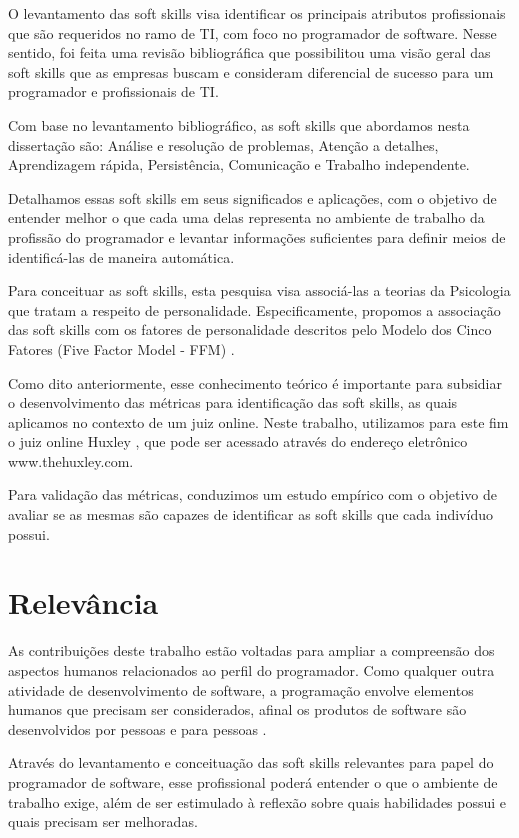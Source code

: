 O levantamento das soft skills visa identificar os principais atributos profissionais que são requeridos no ramo de TI, com foco no programador de software. Nesse sentido, foi feita uma revisão bibliográfica que possibilitou uma visão geral das soft skills que as empresas buscam e consideram diferencial de sucesso para um programador e profissionais de TI.

Com base no levantamento bibliográfico, as soft skills que abordamos nesta dissertação são: Análise e resolução de problemas, Atenção a detalhes, Aprendizagem rápida, Persistência, Comunicação e Trabalho independente. 

Detalhamos essas soft skills em seus significados e aplicações, com o objetivo de entender melhor o que cada uma delas representa no ambiente de trabalho da profissão do programador e levantar informações suficientes para definir meios de identificá-las de maneira automática.

Para conceituar as soft skills, esta pesquisa visa associá-las a teorias da Psicologia que tratam a respeito de personalidade. Especificamente, propomos a associação das soft skills com os fatores de personalidade descritos pelo Modelo dos Cinco Fatores (Five Factor Model - FFM) \cite{mccrae:92}. 

Como dito anteriormente, esse conhecimento teórico é importante para subsidiar o desenvolvimento das métricas para identificação das soft skills, as quais aplicamos no contexto de um juiz online. Neste trabalho, utilizamos para este fim o juiz online Huxley \cite{paes:13}, que pode ser acessado através do endereço eletrônico www.thehuxley.com.

Para validação das métricas, conduzimos um estudo empírico com o objetivo de avaliar se as mesmas são capazes de identificar as soft skills que cada indivíduo possui.

\section{Relevância}

As contribuições deste trabalho estão voltadas para ampliar a compreensão dos aspectos humanos relacionados ao perfil do programador. Como qualquer outra atividade de desenvolvimento de software, a programação envolve elementos humanos que precisam ser considerados, afinal os produtos de software são desenvolvidos por pessoas e para pessoas \cite{john:05}.

Através do levantamento e conceituação das soft skills relevantes para papel do programador de software, esse profissional poderá entender o que o ambiente de trabalho exige, além de ser estimulado à reflexão sobre quais habilidades possui e quais precisam ser melhoradas.

